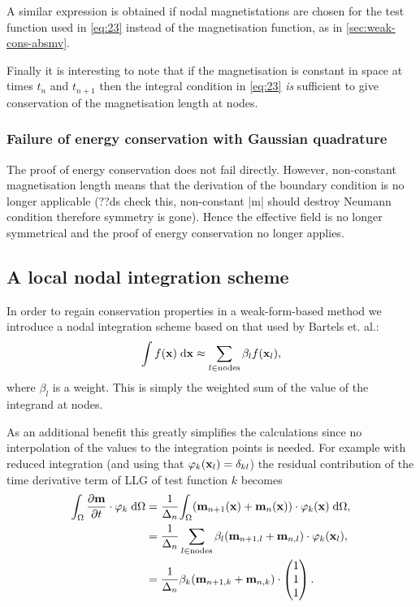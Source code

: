 A similar expression is obtained if nodal magnetistations are chosen for the test function used in \eqref{eq:23} instead of the magnetisation function, as in \autoref{sec:weak-cons-absmv}.

Finally it is interesting to note that if the magnetisation is constant in space at times $t_n$ and $t_{n+1}$ then the integral condition in \eqref{eq:23} \emph{is} sufficient to give conservation of the magnetisation length at nodes.


\subsubsection{Failure of energy conservation with Gaussian quadrature}

The proof of energy conservation does not fail directly.
However, non-constant magnetisation length means that the derivation of the boundary condition is no longer applicable (??ds check this, non-constant |m| should destroy Neumann condition therefore symmetry is gone).
Hence the effective field is no longer symmetrical and the proof of energy conservation no longer applies.

\subsection{A local nodal integration scheme}

In order to regain conservation properties in a weak-form-based method we introduce a nodal integration scheme based on that used by Bartels et. al.\cite{Bartels2006}:
\begin{equation}
  \label{eq:nodal-integration}
  \int f(\mathbf{x}) {\; \text{d}} \mathbf{x} \approx \sum_{l\in \text{nodes}} \beta_l f(\mathbf{x}_l),
\end{equation}
where $\beta_l$ is a weight.
This is simply the weighted sum of the value of the integrand at nodes.

As an additional benefit this greatly simplifies the calculations since no interpolation of the values to the integration points is needed.
For example with reduced integration (and using that $\varphi_k(\mathbf{x}_l) = \delta_{kl}$) the residual contribution of the time derivative term of LLG of test function $k$ becomes
\begin{equation}
  \begin{aligned}
    {\int_{\Omega} \frac{\partial \mathbf{m}}{\partial t}\cdot \mathbf{\varphi}_k {\; \text{d}}{\Omega}} &= \frac{1}{\Delta_{n}} {\int_{\Omega} (\mathbf{m}_{n+1}(\mathbf{x}) + \mathbf{m}_{n}(\mathbf{x})) \cdot \mathbf{\varphi}_k(\mathbf{x}) {\; \text{d}} {\Omega}}, \\
    & = \frac{1}{\Delta_{n}} \sum_{l\in \text{nodes}} \beta_l (\mathbf{m}_{n+1, l} + \mathbf{m}_{n, l}) \cdot \mathbf{\varphi}_k(\mathbf{x}_l), \\
    & = \frac{1}{\Delta_{n}} \beta_k (\mathbf{m}_{n+1, k} + \mathbf{m}_{n, k}) \cdot \begin{pmatrix} 1 \\ 1 \\ 1 \end{pmatrix}.
  \end{aligned}
\end{equation}


